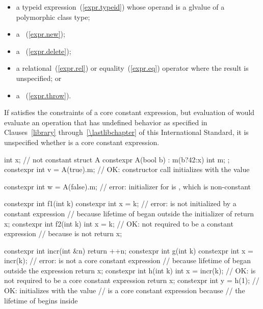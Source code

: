 \begin{itemize}
\item
a typeid expression~(\ref{expr.typeid}) whose operand is a glvalue of a
polymorphic class type;

\item
a ~(\ref{expr.new});

\item
a ~(\ref{expr.delete});

\item
a relational~(\ref{expr.rel}) or equality~(\ref{expr.eq})
operator where the result is unspecified; or

\item
a ~(\ref{expr.throw}).
\end{itemize}

If  satisfies the constraints of a core constant expression, but
evaluation of  would evaluate an operation that has undefined behavior
as specified in Clauses~\ref{library} through~\ref{\lastlibchapter} of this
International Standard, it is unspecified whether  is a core constant
expression.

\begin{example}
\begin{codeblock}
int x;                              // not constant
struct A {
  constexpr A(bool b) : m(b?42:x) { }
  int m;
};
constexpr int v = A(true).m;        // OK: constructor call initializes  with the value 

constexpr int w = A(false).m;       // error: initializer for  is , which is non-constant

constexpr int f1(int k) {
  constexpr int x = k;              // error:  is not initialized by a constant expression
                                    // because lifetime of  began outside the initializer of 
  return x;
}
constexpr int f2(int k) {
  int x = k;                        // OK: not required to be a constant expression
                                    // because  is not 
  return x;
}

constexpr int incr(int &n) {
  return ++n;
}
constexpr int g(int k) {
  constexpr int x = incr(k);        // error:  is not a core constant expression
                                    // because lifetime of  began outside the expression 
  return x;
}
constexpr int h(int k) {
  int x = incr(k);                  // OK:  is not required to be a core constant expression
  return x;
}
constexpr int y = h(1);             // OK: initializes  with the value 
                                    //  is a core constant expression because
                                    // the lifetime of  begins inside 
\end{codeblock}
\end{example}

